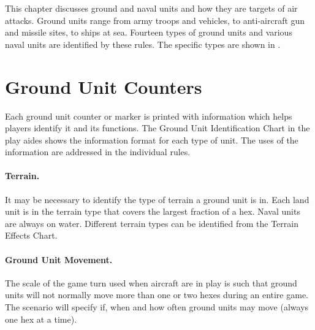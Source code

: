 


This chapter discusses ground and naval units and how they are targets of air attacks. Ground units range from army troops and vehicles, to anti-aircraft gun and missile sites, to ships at sea. Fourteen types of ground units and various naval units are identified by these rules. The specific types are shown in .

\section{Ground Unit Counters}

Each ground unit counter or marker is printed with information which helps players identify it and its functions. The Ground Unit Identification Chart in the play aides shows the information format for each type of unit. The uses of the information are addressed in the individual rules.

\paragraph{Terrain.} It may be necessary to identify the type of terrain a ground unit is in. Each land unit is in the terrain type that covers the largest fraction of a hex. Naval units are always on water. Different terrain types can be identified from the Terrain Effects Chart.

\paragraph{Ground Unit Movement.} The scale of the game turn used when aircraft are in play is such that ground units will not normally move more than one or two hexes during an entire game. The scenario will specify if, when and how often ground units may move (always one hex at a time).

